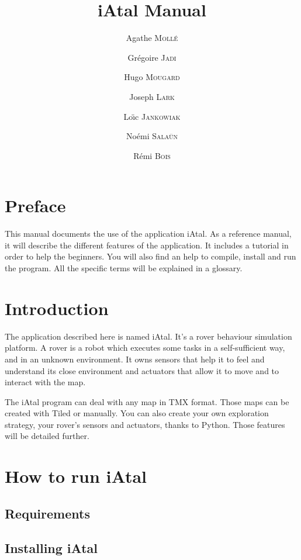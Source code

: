 \documentclass[a4paper,11pt]{article}
\title{iAtal Manual}
\author{Agathe \textsc{Moll\'e} \and Gr\'egoire \textsc{Jadi} \and Hugo \textsc{Mougard} \and Joseph \textsc{Lark} 
\and Lo\"\i c \textsc{Jankowiak} \and No\'emi \textsc{Sala\"un} \and R\'emi \textsc{Bois}}
\date{}
\begin{document}
\maketitle


\section*{Preface}
This manual documents the use of the application iAtal.  As a
reference manual, it will describe the different features of the
application. It includes a tutorial in order to help the
beginners. You will also find an help to compile, install and run the
program.  All the specific terms will be explained in a glossary.
  
\section*{Introduction}
The application described here is named iAtal. It's a rover behaviour
simulation platform.  A rover is a robot which executes some tasks in
a self-sufficient way, and in an unknown environment.  It owns sensors
that help it to feel and understand its close environment and
actuators that allow it to move and to interact with the map.


  The iAtal program can deal with any map in TMX format. Those maps can be created with Tiled %
  or manually.
  You can also create your own exploration strategy, your rover's sensors and actuators, thanks to Python.
  Those features will be detailed further.

\section{How to run iAtal}

  \subsection{Requirements}

  \subsection{Installing iAtal}
\end{document}
